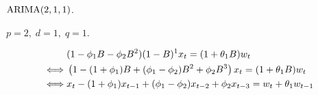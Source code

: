 $\operatorname{ARIMA}(2,1,1)$.

\nl $p=2,\; d=1, \; q =1$.

\begin{align*}
    & (1 - \phi_1 B - \phi_2 B^2)(1-B)^1 x_t = (1+\theta_1 B)w_t \\
    \iff &\pars{1-(1+\phi_1)B + (\phi_1-\phi_2)B^2 + \phi_2B^3}x_t = (1+\theta_1 B)w_t \\
    \iff & x_t - (1+\phi_1)x_{t-1} + (\phi_1-\phi_2)x_{t-2} + \phi_2 x_{t-3} = w_t + \theta_1 w_{t-1}
\end{align*}